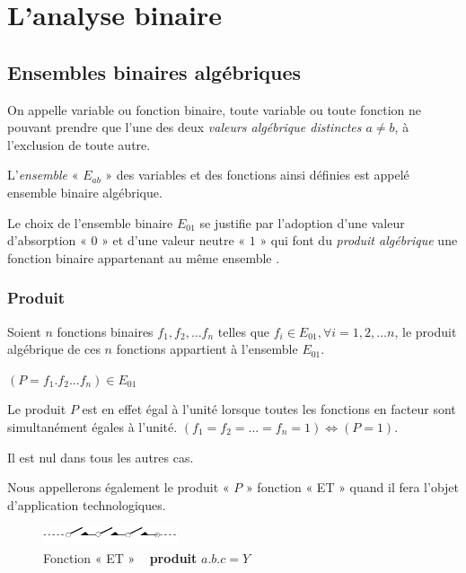 \ifdefined\COMPLETE
\else
    
    
\fi

\chapter{L'analyse binaire}

\section{Ensembles binaires algébriques}

On appelle variable ou fonction binaire, toute variable ou toute fonction
ne pouvant prendre que l'une des deux \textit{valeurs algébrique distinctes
$a\neq b$}, à l'exclusion de toute autre.

L'\textit{ensemble} «  $E_{ab}$  » des variables et des fonctions
ainsi définies est appelé {ensemble binaire algébrique}.

Le choix de l'ensemble binaire $E_{01}$ se justifie par l'adoption
d'une valeur d'absorption « $0$ » et d'une valeur neutre « $1$ » qui
font du \textit{produit algébrique} une fonction binaire appartenant
au même ensemble .

\subsection{Produit}

Soient $n$ fonctions binaires $f_{1},f_{2},\ldots f_{n}$ telles
que $f_{i}\in E_{01},\forall i=1,2,\ldots n$, le produit algébrique
de ces $n$ fonctions appartient à l'ensemble $E_{01}$.

\centerline{$(P=f_{1}.f_{2}\ldots f_{n})\in E_{01}$}

Le produit $P$ est en effet égal à l'unité lorsque toutes les fonctions
en facteur sont simultanément égales à l'unité. $(f_{1}=f_{2}=\ldots=f_{n}=1)\Longleftrightarrow(P=1)$.

Il est nul dans tous les autres cas.

Nous appellerons également le produit « $P$ » fonction « ET » quand
il fera l'objet d'ap\-pli\-ca\-tion technologiques.

\begin{figure}[htb]
\begin{centering}
\includegraphics[width=4cm]{Figures/ET} \vspace{1cm}
\par\end{centering}
\caption{Fonction « ET » ~\textendash{} \textbf{produit} $a.b.c=Y$}

\label{fig:ET} 
\end{figure}


